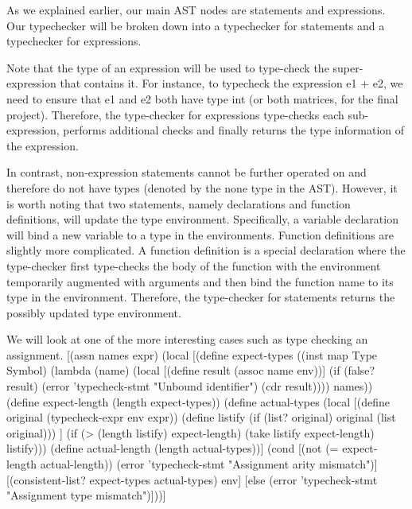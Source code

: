 As we explained earlier, our main AST nodes are statements and expressions. Our typechecker will be broken down into a typechecker for statements and a typechecker for expressions.

Note that the type of an expression will be used to type-check the super-expression that contains it. For instance, to typecheck the expression e1 + e2, we need to ensure that e1 and e2 both have type int (or both matrices, for the final project). Therefore, the type-checker for expressions type-checks each sub-expression, performs additional checks and finally returns the type information of the expression.

In contrast, non-expression statements cannot be further operated on and therefore do not have types (denoted by the none type in the AST). However, it is worth noting that two statements, namely declarations and function definitions, will update the type environment. Specifically, a variable declaration will bind a new variable to a type in the environments. Function definitions are slightly more complicated. A function definition is a special declaration where the type-checker first type-checks the body of the function with the environment temporarily augmented with arguments and then bind the function name to its type in the environment. Therefore, the type-checker for statements returns the possibly updated type environment.

We will look at one of the more interesting cases such as type checking an assignment. 
[(assn names expr)
     (local [(define expect-types
               ((inst map Type Symbol)
                (lambda (name)
                  (local [(define result (assoc name env))]
                    (if (false? result)
                        (error 'typecheck-stmt "Unbound identifier")
                        (cdr result))))
                names))
             (define expect-length (length expect-types))
             (define actual-types
               (local [(define original (typecheck-expr env expr))
                       (define listify (if (list? original)
                                           original
                                           (list original)))
                       ]
                 (if (> (length listify) expect-length)
                     (take listify expect-length)
                     listify)))
             (define actual-length (length actual-types))]
       (cond
         [(not (= expect-length actual-length))
          (error 'typecheck-stmt "Assignment arity mismatch")]
         [(consistent-list? expect-types actual-types) env]
         [else (error 'typecheck-stmt "Assignment type mismatch")]))]

